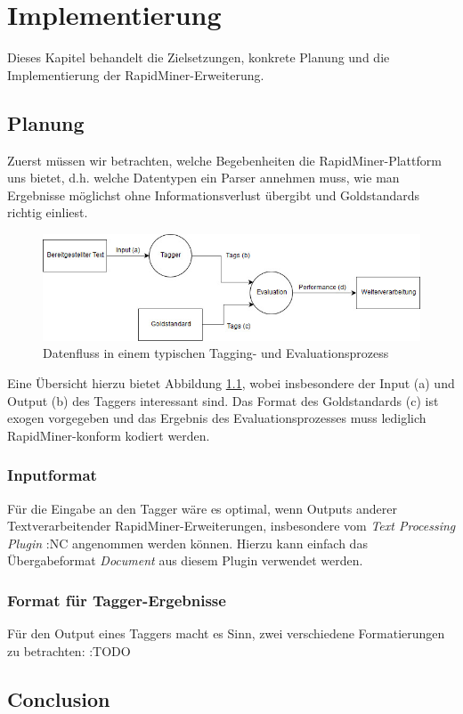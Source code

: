 %
\chapter{Implementierung}
\label{sec:impl}

Dieses Kapitel behandelt die  Zielsetzungen, konkrete Planung und die Implementierung der RapidMiner-Erweiterung.

\section{Planung}
\label{sec:impl:plan}
Zuerst müssen wir betrachten, welche Begebenheiten die RapidMiner-Plattform uns bietet, d.h. welche Datentypen ein Parser annehmen muss, wie man Ergebnisse möglichst ohne Informationsverlust übergibt und Goldstandards richtig einliest.

\begin{figure}[htb]
	\includegraphics[width=\textwidth]{gfx/Dataflow.jpg}
	\caption{Datenfluss in einem typischen Tagging- und Evaluationsprozess}
	\label{fig:impl:overview}
\end{figure}

Eine Übersicht hierzu bietet Abbildung \ref{fig:impl:overview}, wobei insbesondere der Input (a) und Output (b) des Taggers interessant sind. Das Format des Goldstandards (c) ist exogen vorgegeben und das Ergebnis des Evaluationsprozesses muss lediglich RapidMiner-konform kodiert werden.

\subsection{Inputformat}
\label{sec:impl:plan:input}

Für die Eingabe an den Tagger wäre es optimal, wenn Outputs anderer Textverarbeitender RapidMiner-Erweiterungen, insbesondere vom \textit{Text Processing Plugin} :NC angenommen werden können. Hierzu kann einfach das Übergabeformat \textit{Document} aus diesem Plugin verwendet werden.

\subsection{Format für Tagger-Ergebnisse}
\label{sec:impl:plan:thru}

Für den Output eines Taggers macht es Sinn, zwei verschiedene Formatierungen zu betrachten: :TODO

\section{Conclusion}
\label{sec:system:conclusion}

